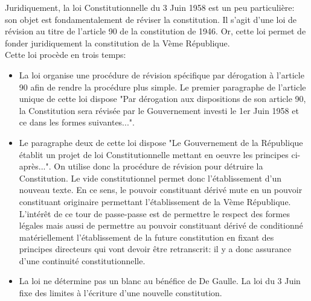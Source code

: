 \documentclass[12pt, a4paper, openany]{book}
\begin{document}
Juridiquement, la loi Constitutionnelle du 3 Juin 1958 est un peu particulière: son objet est fondamentalement de réviser la constitution. Il s'agit d'une loi de révision au titre de l'article 90 de la constitution de 1946. Or, cette loi permet de fonder juridiquement la constitution de la Vème République. \\
Cette loi procède en trois temps:
\begin{itemize}
\item La loi organise une procédure de révision spécifique par dérogation à l'article 90 afin de rendre la procédure plus simple. Le premier paragraphe de l'article unique de cette loi dispose "Par dérogation aux dispositions de son article 90, la Constitution sera révisée par le Gouvernement investi le 1er Juin 1958 et ce dans les formes suivantes...".
\item Le paragraphe deux de cette loi dispose "Le Gouvernement de la République établit un projet de loi Constitutionnelle mettant en oeuvre les principes ci-après...". On utilise donc la procédure de révision pour détruire la Constitution. Le vide constitutionnel permet donc l'établissement d'un nouveau texte. En ce sens, le pouvoir constituant dérivé mute en un pouvoir constituant originaire permettant l'établissement de la Vème République. L'intérêt de ce tour de passe-passe est de permettre le respect des formes légales mais aussi de permettre au pouvoir constituant dérivé de conditionné matériellement l'établissement de la future constitution en fixant des principes directeurs qui vont devoir être retranscrit: il y a donc assurance d'une continuité constitutionnelle. 
\item La loi ne détermine pas un blanc au bénéfice de De Gaulle. La loi du 3 Juin fixe des limites à l'écriture d'une nouvelle constitution. 
\end{itemize}
\end{document}
